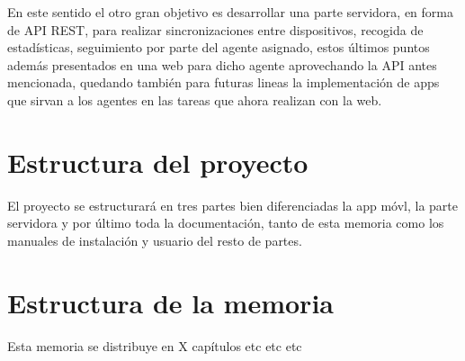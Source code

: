 \documentclass[../pfc.tex]{subfiles}
\begin{document}
En este sentido el otro gran objetivo es desarrollar una parte servidora, en forma de API REST, para realizar sincronizaciones entre dispositivos, recogida de estadísticas, seguimiento por parte del agente asignado, estos últimos puntos además presentados en una web para dicho agente aprovechando la API antes mencionada, quedando también para futuras lineas la implementación de apps que sirvan a los agentes en las tareas que ahora realizan con la web.

\section{Estructura del proyecto}

El proyecto se estructurará en tres partes bien diferenciadas la app móvl, la parte servidora y por último toda la documentación, tanto de esta memoria como los manuales de instalación y usuario del resto de partes. 

\section{Estructura de la memoria}

Esta memoria se distribuye en X capítulos etc etc etc 
\end{document}
